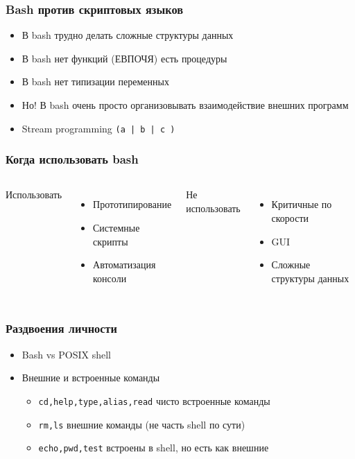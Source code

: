 \begin{frame}
  \frametitle{Bash против скриптовых языков}
  \begin{itemize}
   \item В bash трудно делать сложные структуры данных
   \item В bash нет функций (ЕВПОЧЯ) \pause есть процедуры 
   \item В bash нет типизации переменных
   \item Но! В bash очень просто организовывать взаимодействие внешних программ
   \item Stream programming \texttt{(a | b | c )}
  \end{itemize}
\end{frame}

\begin{frame}
  \frametitle{Когда использовать bash}
  \begin{columns}
    \begin{center}
     {\Large Использовать}
    \end{center}
    \begin{itemize}
      \item Прототипирование
      \item Системные скрипты
      \item Автоматизация консоли
    \end{itemize}
    \begin{center}
     {\Large Не использовать}
    \end{center}
    \begin{itemize}
      \item Критичные по скорости
      \item GUI
      \item Сложные структуры данных
    \end{itemize}
  \end{columns}
\end{frame}

\begin{frame}
  \frametitle{Раздвоения личности}
  \begin{itemize}
    \item  Bash vs POSIX shell
    \item  Внешние и встроенные команды
    \begin{itemize}
      \item \texttt{cd,help,type,alias,read} чисто встроенные команды
      \item \texttt{rm,ls} внешние команды (не часть shell по сути)
      \item \texttt{echo,pwd,test} встроены в shell, но есть как внешние
    \end{itemize}
  \end{itemize}
\end{frame}
